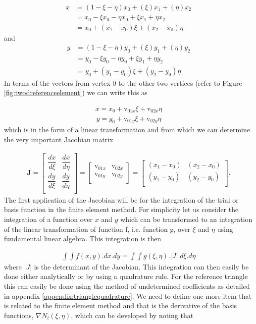 \documentclass[11pt,letterpaper,titlepage]{article}
\newcommand{\beq}{\begin{equation*}
\begin{aligned}}
\newcommand{\eeq}{\end{aligned}
\end{equation*}}
\newcommand{\beqn}{\begin{equation}
	\begin{aligned}}
\newcommand{\eeqn}{\end{aligned}
	\end{equation}}
\numberwithin{equation}{section}
\begin{document}
\beq 
x &= (1-\xi-\eta)x_0 + (\xi)x_1 + (\eta)x_2 \\
&= x_0 -\xi x_0 -\eta x_0 +\xi x_1 +\eta x_2 \\
&= x_0 +(x_1 - x_0)\xi + (x_2 - x_0)\eta
\eeq 
and
\beq 
y &= (1-\xi-\eta)y_0 + (\xi)y_1 + (\eta)y_2 \\
&= y_0 -\xi y_0 -\eta y_0 +\xi y_1 +\eta y_2 \\
&= y_0 +(y_1 - y_0)\xi + (y_2 - y_0)\eta
\eeq 
\newline
In terms of the vectors from vertex $0$ to the other two vertices (refer to Figure \ref{fig:twodreferenceelement}) we can write this as

\beqn \label{eq:x2Dnat}
x = x_0 + \text{v}_{01x} \xi +\text{v}_{02x} \eta
\eeqn 
\beqn \label{eq:y2Dnat}
y = y_0 + \text{v}_{01y} \xi +\text{v}_{02y} \eta
\eeqn 
\newline
which is in the form of a linear transformation and from which we can determine the very important Jacobian matrix

\begingroup
\renewcommand*{\arraystretch}{1.5}
\beqn \label{eq:jacobiantriangle} 
\mathbf{J }= 
\begin{bmatrix}
\dfrac{dx}{d\xi}     & \dfrac{dx}{d\eta} \\
\dfrac{dy}{d\xi}     & \dfrac{dy}{d\eta} \\
\end{bmatrix}=
\begin{bmatrix}
\text{v}_{01x}  & \text{v}_{02x}  \\
\text{v}_{01y}  & \text{v}_{02y}  \\
\end{bmatrix}
=
\begin{bmatrix}
(x_1 - x_0) & (x_2 - x_0)  \\
(y_1 - y_0)  & (y_2 - y_0) \\
\end{bmatrix}.
\eeqn
\endgroup
\newline
The first application of the Jacobian will be for the integration of the trial or basis function in the finite element method. For simplicity let us consider the integration of a function over $x$ and $y$ which can be transformed to an integration of the linear transformation of function f, i.e. function g, over $\xi$ and $\eta$ using fundamental linear algebra. This integration is then

\beq 
\int \int f(x,y) .dx.dy = \int \int g (\xi,\eta).|J|.d\xi.d\eta
\eeq 
\newline
where $|J|$ is the determinant of the Jacobian. This integration can then easily be done either analytically or by using a quadrature rule. For the reference triangle this can easily be done using the method of undetermined coefficients as detailed in appendix \ref{appendix:trianglequadrature}.
\newline
\newline 
We need to define one more item that is related to the finite element method and that is the derivative of the basis functions, $\nabla N_i(\xi,\eta)$, which can be developed by noting that
\end{document}
